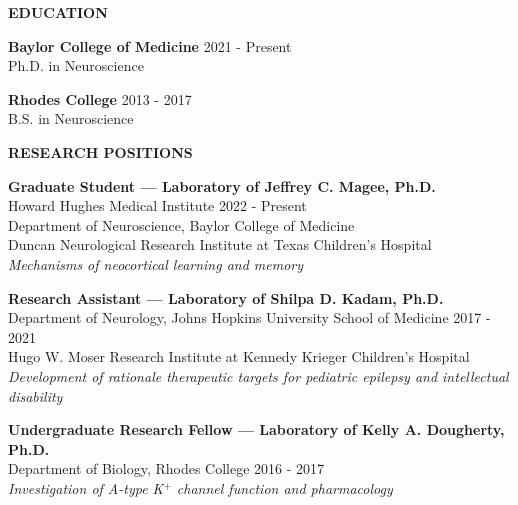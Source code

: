 \documentclass{resume} %
\begin{document}
\begin{rSection}{{\bfseries EDUCATION}}
 
    {\bfseries Baylor College of Medicine} \hfill { 2021 - Present }
    \\ Ph.D. in Neuroscience 
    \vspace{0.5\baselineskip}

    {\bfseries Rhodes College} \hfill { 2013 - 2017  }
    \\ B.S. in Neuroscience 
    \end{rSection}


\begin{rSection}{{\bfseries RESEARCH POSITIONS}}
    
    {\bfseries Graduate Student — Laboratory of Jeffrey C. Magee, Ph.D.}
    \\ Howard Hughes Medical Institute \hfill {2022 - Present}
    \\ Department of Neuroscience, Baylor College of Medicine
    \\ Duncan Neurological Research Institute at Texas Children’s Hospital \vspace{0.3\baselineskip}
    \\ \textit{Mechanisms of neocortical learning and memory}

    {\bfseries Research Assistant — Laboratory of Shilpa D. Kadam, Ph.D.} 
    \\ Department of Neurology, Johns Hopkins University School of Medicine \hfill {2017 - 2021}
    \\ Hugo W. Moser Research Institute at Kennedy Krieger Children’s Hospital \vspace{0.3\baselineskip}
    \\ \textit{Development of rationale therapeutic targets for pediatric epilepsy and intellectual disability}

    {\bfseries Undergraduate Research Fellow — Laboratory of Kelly A. Dougherty, Ph.D.} 
    \\ Department of Biology, Rhodes College \hfill {2016 - 2017} \vspace{0.3\baselineskip}
    \\ \textit{ Investigation of A-type K$^+$ channel function and pharmacology}
\end{rSection}
\end{document}
